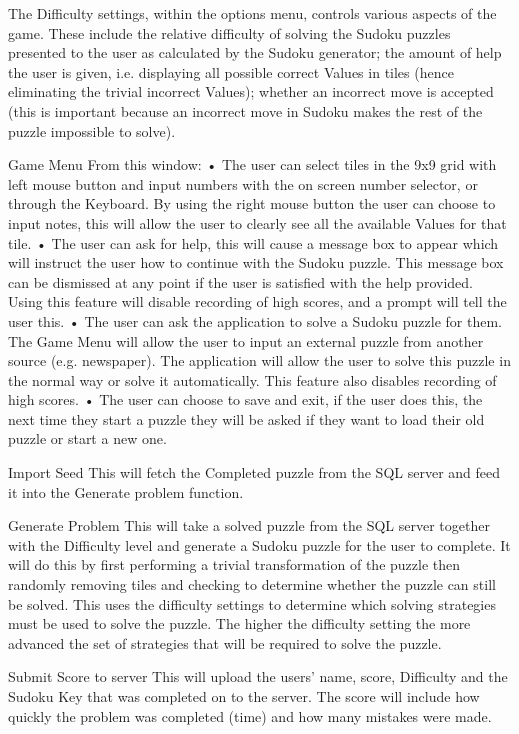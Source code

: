 \documentclass[fleqn]{article}
\begin{document}
The Difficulty settings, within the options menu, controls various aspects of the game. These include the relative difficulty of solving the Sudoku puzzles presented to the user as calculated by the Sudoku generator; the amount of help the user is given, i.e. displaying all possible correct Values in tiles (hence eliminating the trivial incorrect Values); whether an incorrect move is accepted (this is important because an incorrect move in Sudoku makes the rest of the puzzle impossible to solve).

Game Menu
From this window:
•	The user can select tiles in the 9x9 grid with left mouse button and input numbers with the on screen number selector, or through the Keyboard. By using the right mouse button the user can choose to input notes, this will allow the user to clearly see all the available Values for that tile.
•	The user can ask for help, this will cause a message box to appear which will instruct the user how to continue with the Sudoku puzzle. This message box can be dismissed at any point if the user is satisfied with the help provided. Using this feature will disable recording of high scores, and a prompt will tell the user this.
•	The user can ask the application to solve a Sudoku puzzle for them. The Game Menu will allow the user to input an external puzzle from another source (e.g. newspaper). The application will allow the user to solve this puzzle in the normal way or solve it automatically. This feature also disables recording of high scores.
•	The user can choose to save and exit, if the user does this, the next time they start a puzzle they will be asked if they want to load their old puzzle or start a new one.

Import Seed
This will fetch the Completed puzzle from the SQL server and feed it into the Generate problem function.


Generate Problem
This will take a solved puzzle from the SQL server together with the Difficulty level and generate a Sudoku puzzle for the user to complete. It will do this by first performing a trivial transformation of the puzzle then randomly removing tiles and checking to determine whether the puzzle can still be solved. This uses the difficulty settings to determine which solving strategies must be used to solve the puzzle. The higher the difficulty setting the more advanced the set of strategies that will be required to solve the puzzle.

Submit Score to server
This will upload the users’ name, score, Difficulty and the Sudoku Key that was completed on to the server. The score will include how quickly the problem was completed (time) and how many mistakes were made.
\end{document}

